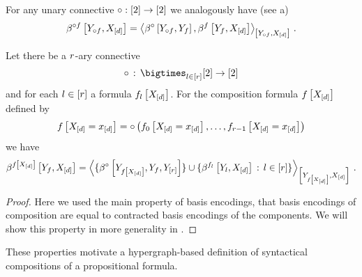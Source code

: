 For any unary connective $\circ: [2] \rightarrow[2]$ we analogously have (see a)
\begin{align*}
    \bencodingofat{\exconnective\exformula}{\headvariableof{\exconnective\exformula},\shortcatvariables}
    = \contractionof{
        \bencodingofat{\exconnective}{\headvariableof{\exconnective\exformula},\formulavar},
        \bencodingofat{\exformula}{\formulavar,\shortcatvariables}
    }{\headvariableof{\exconnective\exformula},\shortcatvariables} \, .
\end{align*}

\begin{lemma}
    \label{lem:basisEncodingConnectiveComposition}
    Let there be a $r$-ary connective
    \begin{align*}
        \exconnective \defcols \bigtimes_{\secatomenumeratorin}[2] \rightarrow [2]
    \end{align*}
    and for each $l\in[r]$ a formula $f_{l}\left[X_{[d]}\right]$.
    For the composition formula $f\left[X_{[d]}\right]$ defined by
    \begin{align*}
        f\left[X_{[d]}=x_{[d]}\right] =    \circ\left(f_{0}\left[X_{[d]}=x_{[d]}\right],\ldots,f_{r-1}\left[X_{[d]}=x_{[d]}\right]\right)
    \end{align*}
    we have
    \begin{align*}
        \bencodingofat{\formulaat{\shortcatvariables}}{\formulavar,\shortcatvariables}
        = \contractionof{
            \{\bencodingofat{\exconnective}{\headvariableof{\formulaat{\shortcatvariables}},\formulavar,\headvariableof{[\secatomorder]}}\}
            \cup \{\bencodingofat{\formulaof{\secatomenumerator}}{\headvariableof{\secatomenumerator},\shortcatvariables} \wcols \secatomenumeratorin \}
        }{\headvariableof{\formulaat{\shortcatvariables}},\shortcatvariables} \, .
    \end{align*}
\end{lemma}
\begin{proof}
    Here we used the main property of basis encodings, that basis encodings of composition are equal to contracted basis encodings of the components.
    We will show this property in more generality in .
\end{proof}


These properties motivate a hypergraph-based definition of syntactical compositions of a propositional formula. %

